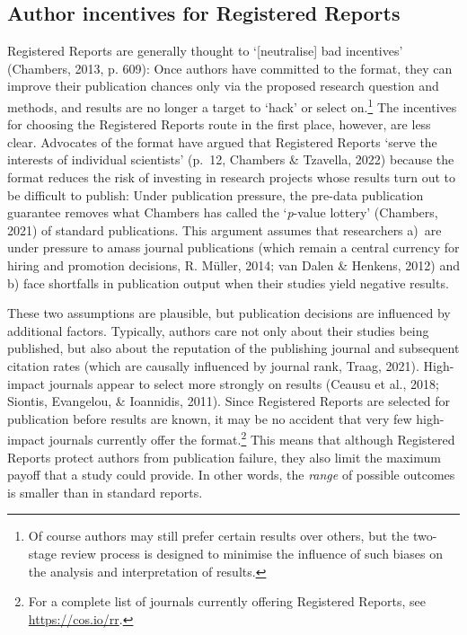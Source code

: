\documentclass[
  british,
  a4paper,
  ,man,mask,floatsintext]{apa6}
\begin{document}
\subsection{Author incentives for Registered Reports}\label{author-incentives-for-registered-reports}

Registered Reports are generally thought to `{[}neutralise{]} bad incentives' (Chambers, 2013, p. 609):
Once authors have committed to the format, they can improve their publication chances only via the proposed research question and methods, and results are no longer a target to `hack' or select on.\footnote{Of course authors may still prefer certain results over others, but the two-stage review process is designed to minimise the influence of such biases on the analysis and interpretation of results.}
The incentives for choosing the Registered Reports route in the first place, however, are less clear.
Advocates of the format have argued that Registered Reports `serve the interests of individual scientists' (p.~12, Chambers \& Tzavella, 2022) because the format reduces the risk of investing in research projects whose results turn out to be difficult to publish:
Under publication pressure, the pre-data publication guarantee removes what Chambers has called the `\emph{p}-value lottery' (Chambers, 2021) of standard publications.
This argument assumes that researchers \mbox{a) are} under pressure to amass journal publications (which remain a central currency for hiring and promotion decisions, R. Müller, 2014; van Dalen \& Henkens, 2012) and b) face shortfalls in publication output when their studies yield negative results.

These two assumptions are plausible, but publication decisions are influenced by additional factors.
Typically, authors care not only about their studies being published, but also about the reputation of the publishing journal and subsequent citation rates (which are causally influenced by journal rank, Traag, 2021).
High-impact journals appear to select more strongly on results (Ceausu et al., 2018; Siontis, Evangelou, \& Ioannidis, 2011).
Since Registered Reports are selected for publication before results are known, it may be no accident that very few high-impact journals currently offer the format.\footnote{For a complete list of journals currently offering Registered Reports, see \url{https://cos.io/rr}.}
This means that although Registered Reports protect authors from publication failure, they also limit the maximum payoff that a study could provide.
In other words, the \emph{range} of possible outcomes is smaller than in standard reports.
\end{document}
